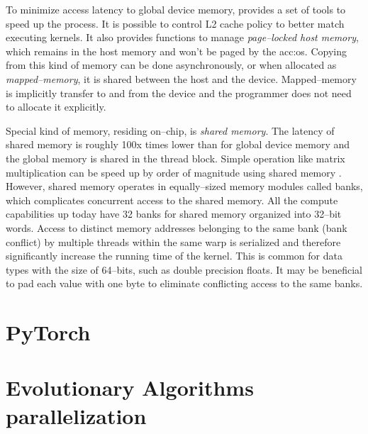 To minimize access latency to global device memory, \cuda provides a set of tools to speed up the process. It is possible to control L2 cache policy to better match executing kernels. It also provides functions to manage \emph{page--locked host memory}, which remains in the host memory and won't be paged by the \acrshort{acc:os}. Copying from this kind of memory can be done asynchronously, or when allocated as \emph{mapped--memory}, it is shared between the host and the device. Mapped--memory is implicitly transfer to and from the device and the programmer does not need to allocate it explicitly.

Special kind of memory, residing on--chip, is \emph{shared memory}. The latency of shared memory is roughly 100x times lower than for global device memory and the global memory is shared in the thread block. Simple operation like matrix multiplication can be speed up by order of magnitude using shared memory \citep{MatrixMultiplicationGPU}. However, shared memory operates in equally--sized memory modules called banks, which complicates concurrent access to the shared memory. All the compute capabilities up today have 32 banks for shared memory organized into 32--bit words. Access to distinct memory addresses belonging to the same bank (bank conflict) by multiple threads within the same warp is serialized and therefore significantly increase the running time of the kernel. This is common for data types with the size of 64--bits, such as double precision floats. It may be beneficial to pad each value with one byte to eliminate conflicting access to the same banks.





\section{PyTorch}




\section{Evolutionary Algorithms parallelization}
